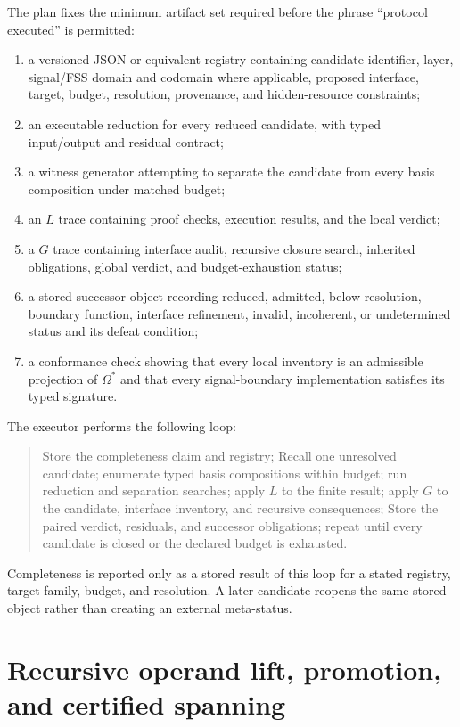 \documentclass[11pt]{article}
\newcommand{\InvReg}{\Omega^{\ast}}
\begin{document}
The plan fixes the minimum artifact set required before the phrase ``protocol executed'' is permitted:
\begin{enumerate}
\item a versioned JSON or equivalent registry containing candidate identifier, layer, signal/FSS domain and codomain where applicable, proposed interface, target, budget, resolution, provenance, and hidden-resource constraints;
\item an executable reduction for every reduced candidate, with typed input/output and residual contract;
\item a witness generator attempting to separate the candidate from every basis composition under matched budget;
\item an $L$ trace containing proof checks, execution results, and the local verdict;
\item a $G$ trace containing interface audit, recursive closure search, inherited obligations, global verdict, and budget-exhaustion status;
\item a stored successor object recording reduced, admitted, below-resolution, boundary function, interface refinement, invalid, incoherent, or undetermined status and its defeat condition;
\item a conformance check showing that every local inventory is an admissible projection of $\InvReg$ and that every signal-boundary implementation satisfies its typed signature.
\end{enumerate}
The executor performs the following loop:
\begin{quote}
Store the completeness claim and registry; Recall one unresolved candidate; enumerate typed basis compositions within budget; run reduction and separation searches; apply $L$ to the finite result; apply $G$ to the candidate, interface inventory, and recursive consequences; Store the paired verdict, residuals, and successor obligations; repeat until every candidate is closed or the declared budget is exhausted.
\end{quote}
Completeness is reported only as a stored result of this loop for a stated registry, target family, budget, and resolution. A later candidate reopens the same stored object rather than creating an external meta-status.


\section{Recursive operand lift, promotion, and certified spanning}
\end{document}
